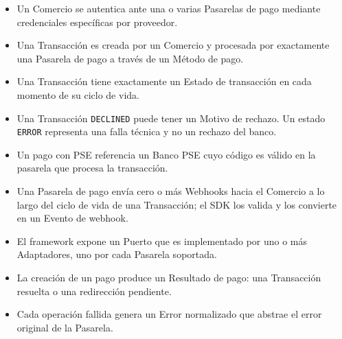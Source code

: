 \begin{itemize}
  \item Un Comercio se autentica ante una o varias Pasarelas de pago mediante credenciales específicas por proveedor.
  \item Una Transacción es creada por un Comercio y procesada por exactamente una Pasarela de pago a través de un Método de pago.
  \item Una Transacción tiene exactamente un Estado de transacción en cada momento de su ciclo de vida.
  \item Una Transacción \texttt{DECLINED} puede tener un Motivo de rechazo. Un estado \texttt{ERROR} representa una falla técnica y no un rechazo del banco.
  \item Un pago con PSE referencia un Banco PSE cuyo código es válido en la pasarela que procesa la transacción.
  \item Una Pasarela de pago envía cero o más Webhooks hacia el Comercio a lo largo del ciclo de vida de una Transacción; el SDK los valida y los convierte en un Evento de webhook.
  \item El framework expone un Puerto que es implementado por uno o más Adaptadores, uno por cada Pasarela soportada.
  \item La creación de un pago produce un Resultado de pago: una Transacción resuelta o una redirección pendiente.
  \item Cada operación fallida genera un Error normalizado que abstrae el error original de la Pasarela.
\end{itemize}
